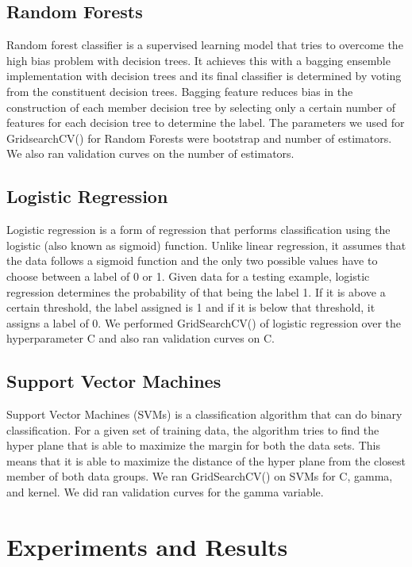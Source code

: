 \documentclass{article}
\begin{document}
\subsection{Random Forests}
\label{random forests}
Random forest classifier is a supervised learning model that tries to overcome the high bias problem with decision trees. It achieves this with a bagging ensemble implementation with decision trees and its final classifier is determined by voting from the constituent decision trees. Bagging feature reduces bias in the construction of each member decision tree by selecting only a certain number of features for each decision tree to determine the label. The parameters we used for GridsearchCV() for Random Forests were bootstrap and number of estimators. We also ran validation curves on the number of estimators.

\subsection{Logistic Regression}
\label{logistic regression}
Logistic regression is a form of regression that performs classification using the logistic (also known as sigmoid) function. Unlike linear regression, it assumes that the data follows a sigmoid function and the only two possible values have to choose between a label of 0 or 1. Given data for a testing example, logistic regression determines the probability of that being the label 1. If it is above a certain threshold, the label assigned is 1 and if it is below that threshold, it assigns a label of 0. We performed GridSearchCV() of logistic regression over the hyperparameter C and also ran validation curves on C. 

\subsection{Support Vector Machines}
\label{support vector machines}

Support Vector Machines (SVMs) is a classification algorithm that can do binary classification. For a given set of training data, the algorithm tries to find the hyper plane that is able to maximize the margin for both the data sets. This means that it is able to maximize the distance of the hyper plane from the closest member of both data groups. We ran GridSearchCV() on SVMs for C, gamma, and kernel. We did ran validation curves for the gamma variable.

\section{Experiments and Results}
\label{results}
\end{document}
